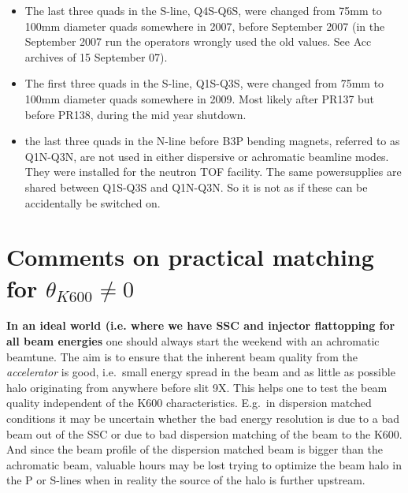 \documentclass[11pt]{report}
\begin{document}
\begin{itemize}
\item The last three quads in the S-line, Q4S-Q6S, were changed from 75mm to 100mm diameter quads
somewhere in 2007, before September 2007
(in the September 2007 run the operators wrongly used the old values. See Acc archives of 15 September 07).
\item The first three quads in the S-line, Q1S-Q3S, were changed from 75mm to 100mm diameter quads
somewhere in 2009. Most likely after PR137 but before PR138,  during the mid year shutdown.
\item the last three quads in the N-line before B3P bending magnets, referred to as Q1N-Q3N,
are not used in either dispersive or achromatic beamline modes. They were installed for the
neutron TOF facility. The same powersupplies are shared between Q1S-Q3S and Q1N-Q3N. So 
it is not as if these can be accidentally be switched on. 
\end{itemize}




\section{Comments on practical matching for $\theta_{K600}\neq0$ }

{\bf In an ideal world (i.e. where we have SSC and injector flattopping for all beam energies}
one should always start the weekend with an achromatic beamtune.
The aim is to ensure that the inherent beam quality from the       
{\it accelerator} is good, i.e.~small energy spread in the beam      
and as little as possible halo originating from anywhere before slit 9X.      
This helps one to test the beam quality independent of the      
K600 characteristics. E.g.~in dispersion matched conditions it may be uncertain      
whether the bad energy resolution is due to a bad beam out of the       
SSC or due to bad dispersion matching of the beam to the K600.      
And since the beam profile of the dispersion matched beam is bigger than
the achromatic beam, valuable hours may be lost trying to optimize the beam halo
in the P or S-lines when in reality the source of the halo is further upstream.
\end{document}
